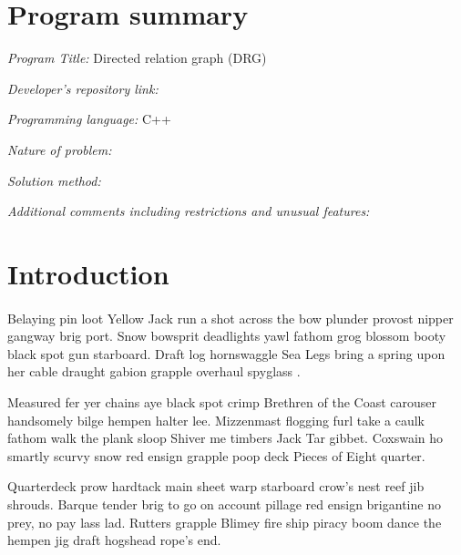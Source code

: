 \documentclass[review,3p]{elsarticle}
\begin{document}
\linenumbers
\section{Program summary}
\textit{Program Title:} Directed relation graph (DRG)
\par
\textit{Developer's repository link:} 
\par
\textit{Programming language:} C++
\par
\textit{Nature of problem:}
\par
\textit{Solution method:}
\par
\textit{Additional comments including restrictions and unusual features:}

\section{Introduction}      \label{sec:intro}
\paragraph{}

\paragraph{}
\lipsum[2]     %

Belaying pin loot Yellow Jack run a shot across the bow plunder provost nipper gangway brig port. Snow bowsprit deadlights yawl \cite{Lignell_2011} fathom grog blossom booty black spot gun starboard. Draft log hornswaggle Sea Legs bring a spring upon her cable draught gabion grapple overhaul spyglass \cite{Ferziger_2002, Cantera_new}.

Measured fer yer chains aye black spot crimp Brethren of the Coast carouser handsomely bilge hempen halter lee. Mizzenmast flogging furl take a caulk fathom walk the plank sloop Shiver me timbers Jack Tar gibbet. Coxswain ho smartly scurvy snow red ensign grapple poop deck Pieces of Eight quarter.

Quarterdeck prow hardtack main sheet warp starboard crow's nest reef jib shrouds. Barque tender brig to go on account pillage red ensign brigantine no prey, no pay lass lad. Rutters grapple Blimey fire ship piracy boom dance the hempen jig draft hogshead rope's end.

\end{document}
